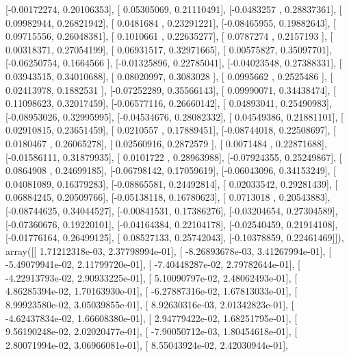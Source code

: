 \documentclass{article}
\begin{document}
       [-0.00172274,  0.20106353],
       [ 0.05305069,  0.21110491],
       [-0.0483257 ,  0.28837361],
       [ 0.09982944,  0.26821942],
       [ 0.0481684 ,  0.23291221],
       [-0.08465955,  0.19882643],
       [ 0.09715556,  0.26048381],
       [ 0.1010661 ,  0.22635277],
       [ 0.0787274 ,  0.2157193 ],
       [ 0.00318371,  0.27054199],
       [ 0.06931517,  0.32971665],
       [ 0.00575827,  0.35097701],
       [-0.06250754,  0.1664566 ],
       [-0.01325896,  0.22785041],
       [-0.04023548,  0.27388331],
       [ 0.03943515,  0.34010688],
       [ 0.08020997,  0.3083028 ],
       [ 0.0995662 ,  0.2525486 ],
       [ 0.02413978,  0.1882531 ],
       [-0.07252289,  0.35566143],
       [ 0.09990071,  0.34438474],
       [ 0.11098623,  0.32017459],
       [-0.06577116,  0.26660142],
       [ 0.04893041,  0.25490983],
       [-0.08953026,  0.32995995],
       [-0.04534676,  0.28082332],
       [ 0.04549386,  0.21881101],
       [ 0.02910815,  0.23651459],
       [ 0.0210557 ,  0.17889451],
       [-0.08744018,  0.22508697],
       [ 0.0180467 ,  0.26065278],
       [ 0.02560916,  0.2872579 ],
       [ 0.0071484 ,  0.22871688],
       [-0.01586111,  0.31879935],
       [ 0.0101722 ,  0.28963988],
       [-0.07924355,  0.25249867],
       [ 0.0864908 ,  0.24699185],
       [-0.06798142,  0.17059619],
       [-0.06043096,  0.34153249],
       [ 0.04081089,  0.16379283],
       [-0.08865581,  0.24492814],
       [ 0.02033542,  0.29281439],
       [ 0.06884245,  0.20509766],
       [-0.05138118,  0.16780623],
       [ 0.0713018 ,  0.20543883],
       [-0.08744625,  0.34044527],
       [-0.00841531,  0.17386276],
       [-0.03204654,  0.27304589],
       [-0.07360676,  0.19220101],
       [-0.04164384,  0.22104178],
       [-0.02540459,  0.21914108],
       [-0.01776164,  0.26499125],
       [ 0.08527133,  0.25742043],
       [-0.10378859,  0.22461469]]), array([[  1.71212318e-03,   2.37798994e-01],
       [ -8.26893678e-03,   3.41267994e-01],
       [ -5.49079941e-02,   2.11799720e-01],
       [ -7.40448287e-02,   2.79782644e-01],
       [ -4.22913793e-02,   2.90933225e-01],
       [  5.10090797e-02,   2.48062493e-01],
       [  4.86285394e-02,   1.70163930e-01],
       [ -6.27887316e-02,   1.67813033e-01],
       [  8.99923580e-02,   3.05039855e-01],
       [  8.92630316e-03,   2.01342823e-01],
       [ -4.62437834e-02,   1.66608380e-01],
       [  2.94779422e-02,   1.68251795e-01],
       [  9.56190248e-02,   2.02020477e-01],
       [ -7.90050712e-03,   1.80454618e-01],
       [  2.80071994e-02,   3.06966081e-01],
       [  8.55043924e-02,   2.42030944e-01],
\end{document}
